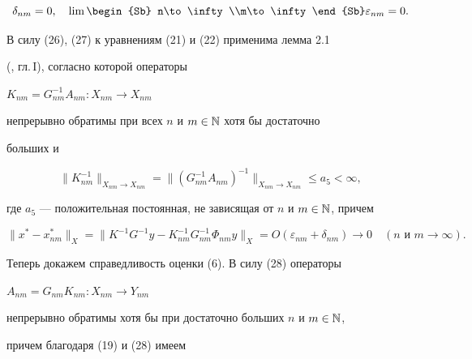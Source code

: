\begin{pf}
\begin{equation}
\delta_{nm}=0,\quad 


\lim\begin{Sb} n\to\infty \\m\to\infty \end{Sb} 


\varepsilon_{nm}=0. 


\end{equation} 


 


В силу (26), (27) к уравнениям (21) и (22) применима лемма 2.1 


(\cite{4}, гл.\,I), согласно которой операторы 


$K_{nm}=G^{-1}_{nm}A_{nm}: X_{nm}\to X_{nm}$ 


непрерывно обратимы при всех $n$ и $m\in\Bbb N$ хотя бы достаточно 


больших и 


\begin{equation} 


\|K^{-1}_{nm}\|_{X_{nm}\to X_{nm}}= 


\|(G^{-1}_{nm}A_{nm})^{-1}\|_{X_{nm}\to X_{nm}} 


\le a_5<\infty, 


\end{equation} 


где $a_5$ --- положительная постоянная, не зависящая от $n$ и $m\in\Bbb 


N$, причем 


\begin{equation} 


\|x^*-x^*_{nm}\|_X=\|K^{-1}G^{-1}y-K^{-1}_{nm} 


G^{-1}_{nm}\Phi_{nm}y\|_X=O(\varepsilon_{nm}+\delta_{nm})\to 0 


\quad (\text {$n$ и $m\to\infty$}). 


\end{equation} 


 


Теперь докажем справедливость оценки (6). В силу (28) операторы 


$A_{nm}=G_{nm}K_{nm}:X_{nm}\to Y_{nm}$ 


непрерывно обратимы хотя бы при достаточно больших $n$ и $m\in\Bbb N$, 


причем благодаря (19) и (28) имеем 


\begin{equation} 



\end{equation}
\end{pf}
